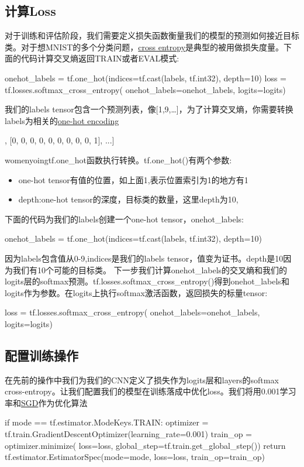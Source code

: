 \subsection{计算Loss}
对于训练和评估阶段，我们需要定义损失函数衡量我们的模型的预测如何接近目标类。对于想MNIST的多个分类问题，\href{https://en.wikipedia.org/wiki/Cross_entropy}{cross entropy}是典型的被用做损失度量。下面的代码计算交叉熵返回TRAIN或者EVAL模式:
\begin{python}
onehot_labels = tf.one_hot(indices=tf.cast(labels, tf.int32), depth=10)
loss = tf.losses.softmax_cross_entropy(
    onehot_labels=onehot_labels, logits=logits)
\end{python}
我们的labels tensor包含一个预测列表，像[1,9,\ldots]，为了计算交叉熵，你需要转换labels为相关的\href{https://www.quora.com/What-is-one-hot-encoding-and-when-is-it-used-in-data-science}{one-hot encoding}
\begin{python}
[[0, 1, 0, 0, 0, 0, 0, 0, 0, 0],
 [0, 0, 0, 0, 0, 0, 0, 0, 0, 1],
 ...]
\end{python}
womenyoingtf.one\_hot函数执行转换。tf.one\_hot()有两个参数:
\begin{itemize}
\item one-hot tensor有值的位置，如上面1,表示位置索引为1的地方有1
\item depth:one-hot tensor的深度，目标类的数量，这里depth为10,
\end{itemize}
下面的代码为我们的labels创建一个one-hot tensor，onehot\_labels:
\begin{python}
onehot_labels = tf.one_hot(indices=tf.cast(labels, tf.int32), depth=10)
\end{python}
因为labels包含值从0-9,indices是我们的labels tensor，值变为证书。depth是10因为我们有10个可能的目标类。
下一步我们计算onehot\_labels的交叉熵和我们的logits层的softmax预测。tf.losses.softmax\_cross\_entropy()得到onehot\_labels和logits作为参数。在logits上执行softmax激活函数，返回损失的标量tensor:
\begin{python}
loss = tf.losses.softmax_cross_entropy(
    onehot_labels=onehot_labels, logits=logits)
\end{python}
\subsection{配置训练操作}
在先前的操作中我们为我们的CNN定义了损失作为logits层和layers的softmax cross-entropy。让我们配置我们的模型在训练落成中优化loss。我们将用0.001学习率和\href{https://en.wikipedia.org/wiki/Stochastic_gradient_descent}{SGD}作为优化算法\begin{python}
if mode == tf.estimator.ModeKeys.TRAIN:
  optimizer = tf.train.GradientDescentOptimizer(learning_rate=0.001)
  train_op = optimizer.minimize(
      loss=loss,
      global_step=tf.train.get_global_step())
  return tf.estimator.EstimatorSpec(mode=mode, loss=loss, train_op=train_op)

\end{python}
